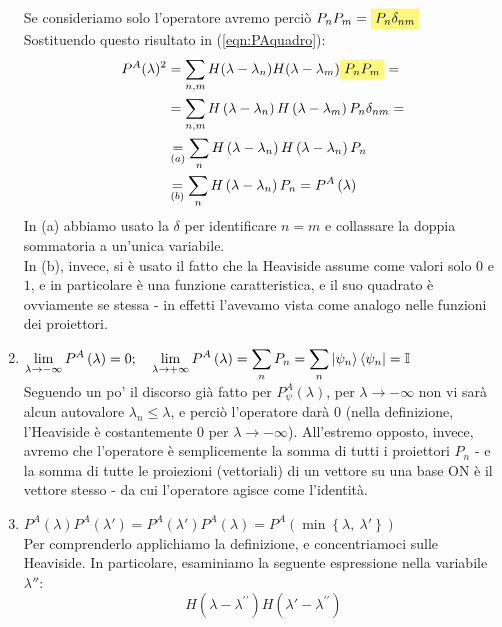 \documentclass[../../FisicaTeorica.tex]{subfiles}
\begin{document}
\begin{enumerate}
	Se consideriamo solo l'operatore  avremo perciò $P_n P_m = \hlc{Yellow}{P_n \delta_{nm}}$\\
	Sostituendo questo risultato in (\ref{eqn:PAquadro}):
	\begin{align*}
	P^A(\lambda)^2 &= \sum_{n,m} H(\lambda -\lambda_n)H(\lambda-\lambda_m) \hlc{Yellow}{P_n P_m} = \\
	&= \sum_{n,m}{H\left(\lambda-\lambda_n\right)H\left(\lambda-\lambda_m\right)P_n\delta_{nm}}= \\
	&\underset{(a)}{=} \sum_{n}{H\left(\lambda-\lambda_n\right)H\left(\lambda-\lambda_n\right)P_n}\\
	&\underset{(b)}{=}\sum_{n}{H\left(\lambda-\lambda_n\right)P_n}=P^A\left(\lambda\right)
	\end{align*}
	In (a) abbiamo usato la $\delta$ per identificare $n=m$ e collassare la doppia sommatoria a un'unica variabile.\\
	In (b), invece, si è usato il fatto che la Heaviside assume come valori solo $0$ e $1$, e in particolare è una funzione caratteristica, e il suo quadrato è ovviamente se stessa - in effetti l'avevamo vista come analogo nelle funzioni dei proiettori.
	\item $
	\displaystyle 
	\lim_{\lambda\rightarrow-\infty}{P^A\left(\lambda\right)=0};\quad 
	\lim_{\lambda\rightarrow+\infty}{P^A\left(\lambda\right)}=\sum_{n} P_n=\sum_{n}\left|\psi_n\right\rangle\left\langle\psi_n\right|=\mathbb{I}
	$\\
	Seguendo un po' il discorso già fatto per $P_\psi^A(\lambda)$, per $\lambda\to-\infty$ non vi sarà alcun autovalore $\lambda_n \leq \lambda$, e perciò l'operatore darà $0$ (nella definizione, l'Heaviside è costantemente $0$ per $\lambda\to -\infty$). All'estremo opposto, invece, avremo che l'operatore è semplicemente la somma di tutti i proiettori $P_n$ - e la somma di tutte le proiezioni (vettoriali) di un vettore su una base ON è il vettore stesso - da cui l'operatore agisce come l'identità. 
	\item 
	$\displaystyle P^A\left(\lambda\right)P^A\left(\lambda '\right)=P^A\left(\lambda '\right)P^A\left(\lambda\right)=P^A\left(\min{\left\{\lambda,\ \lambda '\right\}}\right) $\\
	Per comprenderlo applichiamo la definizione, e concentriamoci sulle Heaviside. In particolare, esaminiamo la seguente espressione nella variabile $\lambda''$:
	\[
	H\left(\lambda-\lambda^{\prime\prime}\right)H(\lambda '-\lambda^{\prime\prime})
\]
\end{enumerate}
\end{document}
